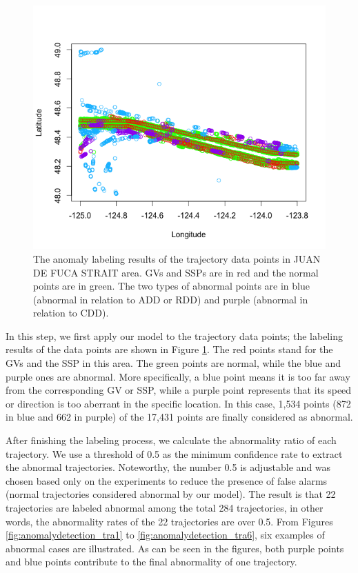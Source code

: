 \documentclass[12pt,glossary]{dalcsthesis}
\begin{document}
\begin{figure}[!htb]
\centering
\includegraphics[width=5in]{labelJDFK.png}
\caption{The anomaly labeling results of the trajectory data points in JUAN DE FUCA STRAIT area. GVs and SSPs are in red and the normal points are in green. The two types of abnormal points are in blue (abnormal in relation to ADD or RDD) and purple (abnormal in relation to CDD).}
\label{fig:anomalydetection_points}
\end{figure}

In this step, we first apply our model to the trajectory data points; the labeling results of the data points are shown in Figure \ref{fig:anomalydetection_points}. The red points stand for the GVs and the SSP in this area. The green points are normal, while the blue and purple ones are abnormal. More specifically, a blue point means it is too far away from the corresponding GV or SSP, while a purple point represents that its speed or direction is too aberrant in the specific location.  In this case, 1,534 points (872 in blue and 662 in purple) of the 17,431 points are finally considered as abnormal. 

After finishing the labeling process, we calculate the abnormality ratio of each trajectory. We use a threshold of 0.5 as the minimum confidence rate to extract the abnormal trajectories. Noteworthy, the number 0.5 is adjustable and was chosen based only on the experiments to reduce the presence of false alarms (normal trajectories considered abnormal by our model). The result is that 22 trajectories are labeled abnormal among the total 284 trajectories, in other words, the abnormality rates of the 22 trajectories are over 0.5. From Figures \ref{fig:anomalydetection_tra1} to \ref{fig:anomalydetection_tra6}, six examples of abnormal cases are illustrated. As can be seen in the figures, both purple points and blue points contribute to the final abnormality of one trajectory.
\end{document}
